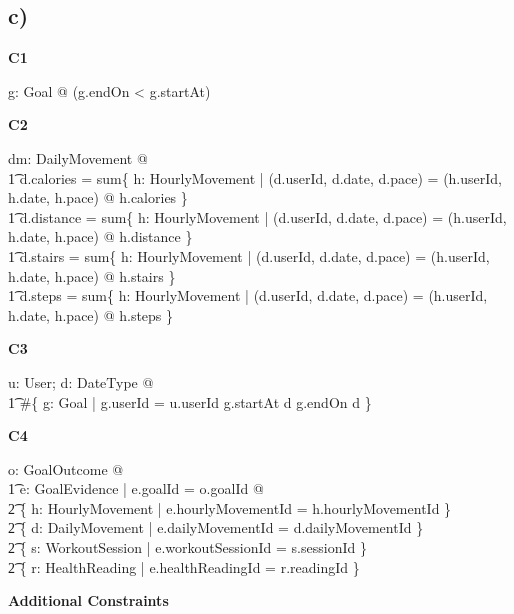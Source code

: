 \documentclass{article}
\begin{document}
\subsection*{\small c)}
\textbf{\small{C1}}
\begin{zed}
\forall g: Goal @ \lnot (g.endOn < g.startAt) \\
\end{zed}
\textbf{\small{C2}}
\begin{zed}
\forall dm: DailyMovement @ \\
    \t1 d.calories = sum\{ h: HourlyMovement | (d.userId, d.date, d.pace) = (h.userId, h.date, h.pace) @ h.calories \} \\
    \t1 d.distance = sum\{ h: HourlyMovement | (d.userId, d.date, d.pace) = (h.userId, h.date, h.pace) @ h.distance \} \\
    \t1 d.stairs = sum\{ h: HourlyMovement | (d.userId, d.date, d.pace) = (h.userId, h.date, h.pace) @ h.stairs \} \\
    \t1 d.steps = sum\{ h: HourlyMovement | (d.userId, d.date, d.pace) = (h.userId, h.date, h.pace) @ h.steps \} \\
\end{zed}
\textbf{\small{C3}}
\begin{zed}
\forall u: User; d: DateType @ \\
\t1 \#\{ g: Goal | g.userId = u.userId \land g.startAt \leq d \land g.endOn \geq d \} 
\end{zed}
\textbf{\small{C4}}
\begin{zed}
\forall o: GoalOutcome @ \\
\t1 \exists e: GoalEvidence | e.goalId = o.goalId @ \\
\t2 \{ h: HourlyMovement | e.hourlyMovementId = h.hourlyMovementId \} \neq \emptyset \lor \\
\t2 \{ d: DailyMovement | e.dailyMovementId = d.dailyMovementId \} \neq \emptyset \lor \\
\t2 \{ s: WorkoutSession | e.workoutSessionId = s.sessionId \} \neq \emptyset \\
\t2 \{ r: HealthReading | e.healthReadingId = r.readingId \} \neq \emptyset \lor \\
\end{zed}
\textbf{\small{Additional Constraints}}
\end{document}
